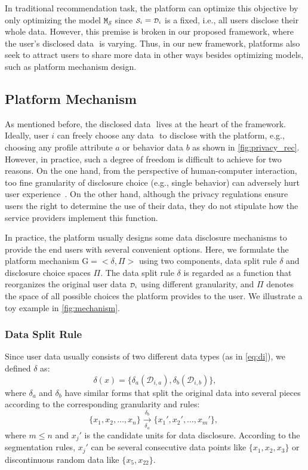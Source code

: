 In traditional recommendation task, the platform can optimize this objective by only optimizing the model $\texttt{M}_{{\scriptscriptstyle \mathcal{S}}}$ since ${\scriptstyle \mathcal{S}_i}= {\scriptstyle \mathcal{D}_i}$ is a fixed, i.e., all users disclose their whole data.
However, this premise is broken in our proposed framework, where the user's disclosed data $\si{}$ is varying.
Thus, in our new framework, platforms also seek to attract users to share more data in other ways besides optimizing models, such as platform mechanism design.



\subsection{Platform Mechanism}
\label{sec:platform}

As mentioned before, the disclosed data $\si{}$ lives at the heart of the framework.
Ideally, user $i$ can freely choose any data $\si{}$ to disclose with the platform, e.g., choosing any profile attribute $a$ or behavior data $b$ as shown in \cref{fig:privacy_rec}.
However, in practice, such a degree of freedom is difficult to achieve for two reasons.
On the one hand, from the perspective of human-computer interaction, too fine granularity of disclosure choice (e.g., single behavior) can adversely hurt user experience~\cite{Zhang:hcs19:Proactive}.
On the other hand, although the privacy regulations ensure users the right to determine the use of their data, they do not stipulate how the service providers implement this function.


In practice, the platform usually designs some data disclosure mechanisms to provide the end users with several convenient options.
Here, we formulate the platform mechanism $\mathrm{G}=<\delta, \Pi>$ using two components, data split rule $\delta$ and disclosure choice spaces $\Pi$.
The data split rule $\delta$ is regarded as a function that reorganizes the original user data ${\scriptstyle \mathcal{D}_i}$ using different granularity, and $\Pi$ denotes the space of all possible choices the platform provides to the user.
We illustrate a toy example in \cref{fig:mechanism}.

\subsubsection{\textbf{Data Split Rule}}
Since user data usually consists of two different data types (as in \cref{eq:di}), we defined $\delta$ as:
\begin{equation*}
    \delta (x) = \{\delta_a({\scriptstyle \mathcal{D}_{i,a}}), \delta_b({\scriptstyle \mathcal{D}_{i,b}}) \},
\end{equation*}
where $\delta_a$ and $\delta_b$ have similar forms that split the original data into several pieces according to the corresponding granularity and rules:
\begin{equation*}
    \{x_1, x_2,\dots,x_n\} \xrightarrow[\delta_a]{\delta_b}  \{x_1', x_2',\dots,x_m'\}, \,\, %
\end{equation*}
where $m \leq n$ and $x_j'$ is the candidate units for data disclosure. %
According to the segmentation rules, $x_j'$ can be several consecutive data points like $\{x_1, x_2, x_3\}$ or discontinuous random data like $\{x_5, x_{22}\}$.

